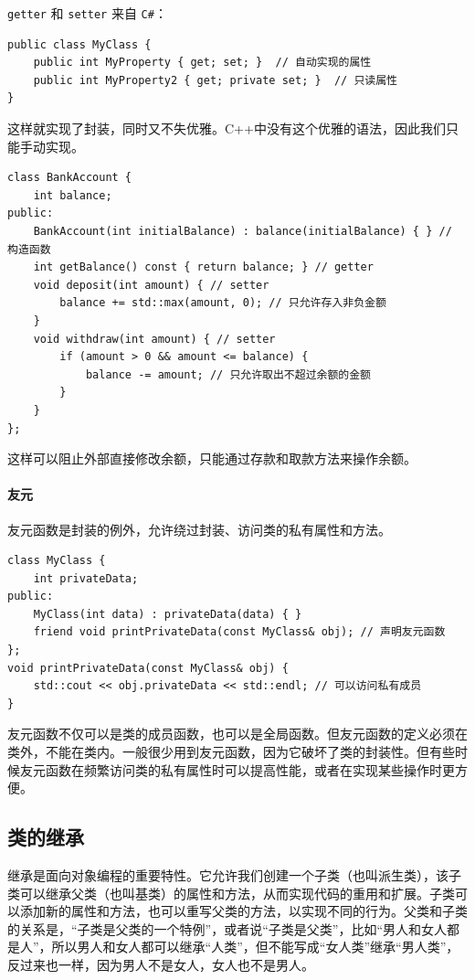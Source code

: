 \begin{remark}{}
    \verb|getter| 和 \verb|setter| 来自 \verb|C#|：
    \begin{verbatim}
public class MyClass {
    public int MyProperty { get; set; }  // 自动实现的属性
    public int MyProperty2 { get; private set; }  // 只读属性
}
    \end{verbatim}
    这样就实现了封装，同时又不失优雅。C++中没有这个优雅的语法，因此我们只能手动实现。
\end{remark}

\begin{verbatim}
class BankAccount {
    int balance;
public:
    BankAccount(int initialBalance) : balance(initialBalance) { } // 构造函数
    int getBalance() const { return balance; } // getter
    void deposit(int amount) { // setter
        balance += std::max(amount, 0); // 只允许存入非负金额
    }
    void withdraw(int amount) { // setter
        if (amount > 0 && amount <= balance) {
            balance -= amount; // 只允许取出不超过余额的金额
        }
    }   
};
\end{verbatim}
这样可以阻止外部直接修改余额，只能通过存款和取款方法来操作余额。

\paragraph{友元}

友元函数是封装的例外，允许绕过封装、访问类的私有属性和方法。

\begin{verbatim}
class MyClass {
    int privateData;
public:
    MyClass(int data) : privateData(data) { }
    friend void printPrivateData(const MyClass& obj); // 声明友元函数
};
void printPrivateData(const MyClass& obj) {
    std::cout << obj.privateData << std::endl; // 可以访问私有成员
}
\end{verbatim}

友元函数不仅可以是类的成员函数，也可以是全局函数。但友元函数的定义必须在类外，不能在类内。一般很少用到友元函数，因为它破坏了类的封装性。但有些时候友元函数在频繁访问类的私有属性时可以提高性能，或者在实现某些操作时更方便。

\subsection{类的继承}

继承是面向对象编程的重要特性。它允许我们创建一个子类（也叫派生类），该子类可以继承父类（也叫基类）的属性和方法，从而实现代码的重用和扩展。子类可以添加新的属性和方法，也可以重写父类的方法，以实现不同的行为。父类和子类的关系是，“子类是父类的一个特例”，或者说“子类是父类”，比如“男人和女人都是人”，所以男人和女人都可以继承“人类”，但不能写成“女人类”继承“男人类”，反过来也一样，因为男人不是女人，女人也不是男人。

